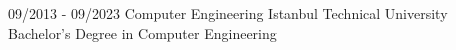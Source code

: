 \documentclass[9pt]{developercv} %
\begin{document}
\vspace{-10 pt}
\begin{entrylist}
    \entry
		{09/2013 - 09/2023}
		{ Computer Engineering }
		{Istanbul Technical University}
		{Bachelor's Degree in Computer Engineering}

\end{entrylist}

\vspace{-10 pt}
\end{document}
